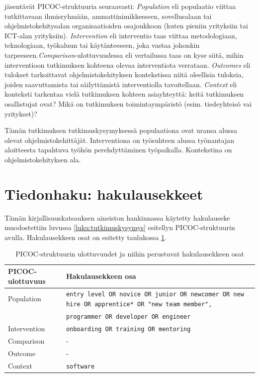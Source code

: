 \documentclass[utf8]{gradu3}
\begin{document}
\textcite{kitchenham-charters-2007} jäsentävät PICOC-struktuuria seuraavasti: \textit{Population} eli populaatio viittaa tutkittavaan ihmisryhmään, ammattinimikkeeseen, sovellusalaan tai ohjelmistokehitysalan organisaatioiden osajoukkoon (kuten pieniin yrityksiin tai ICT-alan yrityksiin). \textit{Intervention} eli interventio taas viittaa metodologiaan, teknologiaan, työkaluun tai käytänteeseen, joka vastaa johonkin tarpeeseen.\textit{Comparison}-ulottuvuudessa eli vertailussa taas on kyse siitä, mihin interventioon tutkimuksen kohteena olevaa interventiota verrataan. \textit{Outcomes} eli tulokset tarkoittavat ohjelmistokehityksen kontekstissa niitä oleellisia tuloksia, joiden saavuttamista tai säilyttämistä interventiolla tavoitellaan. \textit{Context} eli konteksti tarkentaa vielä tutkimuksen kohteen asiayhteyttä: keitä tutkimuksen osallistujat ovat? Mikä on tutkimuksen toimintaympäristö (esim. tiedeyhteisö vai yritykset)? \parencite{kitchenham-charters-2007}

Tämän tutkimuksen tutkimuskysymyksessä populaationa ovat uransa alussa olevat ohjelmistokehittäjät. Interventiona on työsuhteen alussa työnantajan aloitteesta tapahtuva työhön perehdyttäminen työpaikalla. Kontekstina on ohjelmistokehityksen ala. 

\section{Tiedonhaku: hakulausekkeet}

Tämän kirjallisuuskatsauksen aineiston hankinnassa käytetty hakulauseke muodostettiin luvussa  \ref{luku:tutkimuskysymys} esitellyn PICOC-struktuurin avulla. Hakulausekkeen osat on esitetty taulukossa \ref{tbl:picoc-ulottuvuudet}.

\begin{table}[h]
    \begin{tabular}{lp{}}
        \toprule
        {PICOC-ulottuvuus} & Hakulausekkeen osa \\
        \midrule
        Population & {\tt entry level OR novice OR junior OR newcomer OR new hire OR apprentice* OR "new team member", } \\
        & {\tt programmer OR developer OR engineer} \\
        \midrule
        Intervention & {\tt onboarding OR training OR mentoring} \\
        \midrule
        Comparison & - \\
        \midrule
        Outcome & - \\
        \midrule
        Context & {\tt software} \\
        \bottomrule
    \end{tabular}  
    \caption{PICOC-struktuurin ulottuvuudet ja niihin perustuvat hakulausekkeen osat}
    \label{tbl:picoc-ulottuvuudet}
\end{table}
\end{document}
